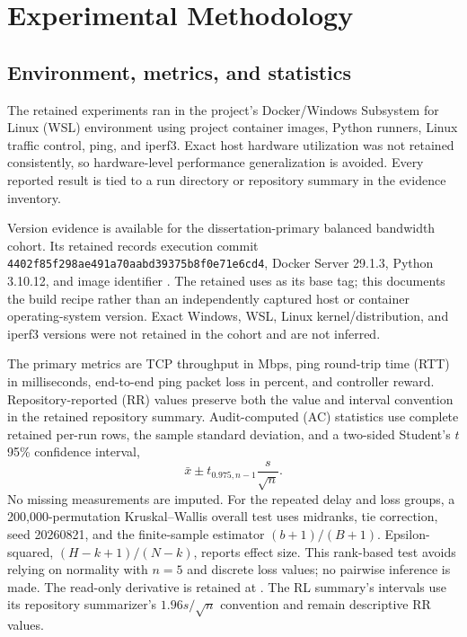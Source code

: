 \section{Experimental Methodology}
\label{sec:experimental-methodology}

\subsection{Environment, metrics, and statistics}

The retained experiments ran in the project's Docker/Windows Subsystem for Linux (WSL) environment using project container images, Python runners, Linux traffic control, ping, and iperf3. Exact host hardware utilization was not retained consistently, so hardware-level performance generalization is avoided. Every reported result is tied to a run directory or repository summary in the evidence inventory.

Version evidence is available for the dissertation-primary balanced bandwidth cohort. Its retained  records execution commit \texttt{4402f85f298ae491a70aabd39375b8f0e71e6cd4}, Docker Server 29.1.3, Python 3.10.12, and image identifier . The retained  uses  as its base tag; this documents the build recipe rather than an independently captured host or container operating-system version. Exact Windows, WSL, Linux kernel/distribution, and iperf3 versions were not retained in the cohort and are not inferred.

The primary metrics are TCP throughput in Mbps, ping round-trip time (RTT) in milliseconds, end-to-end ping packet loss in percent, and controller reward. Repository-reported (RR) values preserve both the value and interval convention in the retained repository summary. Audit-computed (AC) statistics use complete retained per-run rows, the sample standard deviation, and a two-sided Student's $t$ 95\% confidence interval,
\[
  \bar{x} \pm t_{0.975,n-1}\frac{s}{\sqrt{n}}.
\]
No missing measurements are imputed. For the repeated delay and loss groups, a 200,000-permutation Kruskal--Wallis overall test uses midranks, tie correction, seed 20260821, and the finite-sample estimator $(b+1)/(B+1)$. Epsilon-squared, $(H-k+1)/(N-k)$, reports effect size. This rank-based test avoids relying on normality with $n=5$ and discrete loss values; no pairwise inference is made. The read-only derivative is retained at . The RL summary's intervals use its repository summarizer's $1.96s/\sqrt{n}$ convention and remain descriptive RR values.

